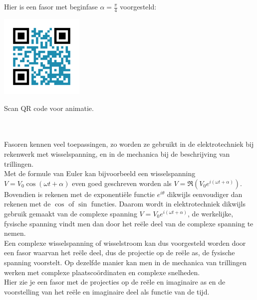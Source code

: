 Hier is een fasor met beginfase $\alpha=\frac{\pi}{4}$ voorgesteld:\\

\begin{minipage}{.25\linewidth}
	\raggedright
	\includegraphics[width=4cm]{3_gonio_complexe_getallen/inputs/QR_Code_ANIMATIE5_module3}
\end{minipage}
\begin{minipage}{.7\linewidth}
	Scan QR code voor animatie.
\end{minipage}    \\   \\

Fasoren kennen veel toepassingen, zo worden ze gebruikt in de elektrotechniek bij rekenwerk met wisselspanning, en in de mechanica bij de beschrijving van trillingen. \\ 
Met de formule van Euler kan bijvoorbeeld een wisselspanning $V=V_{0}\cos(\omega t + \alpha)$ even goed geschreven worden als $V=\Re (V_{0}e^{i(\omega t + \alpha)}) $. Bovendien is rekenen met de exponenti\"{e}le functie $e^{i\theta}$ dikwijls eenvoudiger dan rekenen met de $\cos$ of $\sin$ functies. Daarom wordt in elektrotechniek dikwijls gebruik gemaakt van de complexe spanning $V=V_{0}e^{i(\omega t + \alpha)}$, de werkelijke, fysische spanning vindt men dan door het re\"{e}le deel van de complexe spanning te nemen.\\
Een complexe wisselspanning of wisselstroom kan dus voorgesteld worden door een fasor waarvan het re\"{e}le deel, dus de projectie op de re\"{e}le as, de fysische spanning voorstelt.  Op dezelfde manier kan men in de mechanica van trillingen werken met complexe plaatsco\"{o}rdinaten en complexe snelheden.\\

Hier zie je een fasor met de projecties op de re\"{e}le en imaginaire as en de voorstelling van het re\"{e}le en imaginaire deel als functie van de tijd. \\

